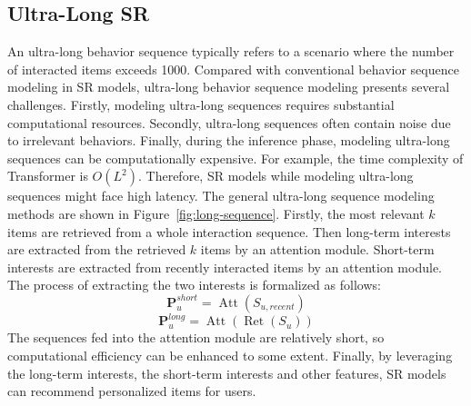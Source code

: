 \documentclass[review]{fcs}
\begin{document}
	\subsection{Ultra-Long SR}
	An ultra-long behavior sequence typically refers to a scenario where the number of interacted items exceeds 1000. Compared with conventional behavior sequence modeling in SR models, ultra-long behavior sequence modeling presents several challenges. Firstly, modeling ultra-long sequences requires substantial computational resources. Secondly, ultra-long sequences often contain noise due to irrelevant behaviors. Finally, during the inference phase, modeling ultra-long sequences can be computationally expensive. For example, the time complexity of Transformer is  $O(L^{2})$. Therefore, SR models while modeling ultra-long sequences might face high latency. The general ultra-long sequence modeling methods are shown in Figure~\ref{fig:long-sequence}. Firstly, the most relevant $k$ items are retrieved from a whole interaction sequence. Then long-term interests are extracted from the retrieved $k$ items by an attention module. Short-term interests are extracted from recently interacted items by an attention module. The process of extracting the two interests is formalized as follows:
	\begin{equation}
		\mathbf{P}_{u}^{short} = \operatorname{Att}(S_{u,recent})
	\end{equation}
	\begin{equation}
		\mathbf{P}_{u}^{long} = \operatorname{Att}(\operatorname{Ret}(S_{u}))
	\end{equation}
	The sequences fed into the attention module are relatively short, so computational efficiency can be enhanced to some extent. Finally, by leveraging the long-term interests, the short-term interests and other features, SR models can recommend personalized items for users.
	
\end{document}

